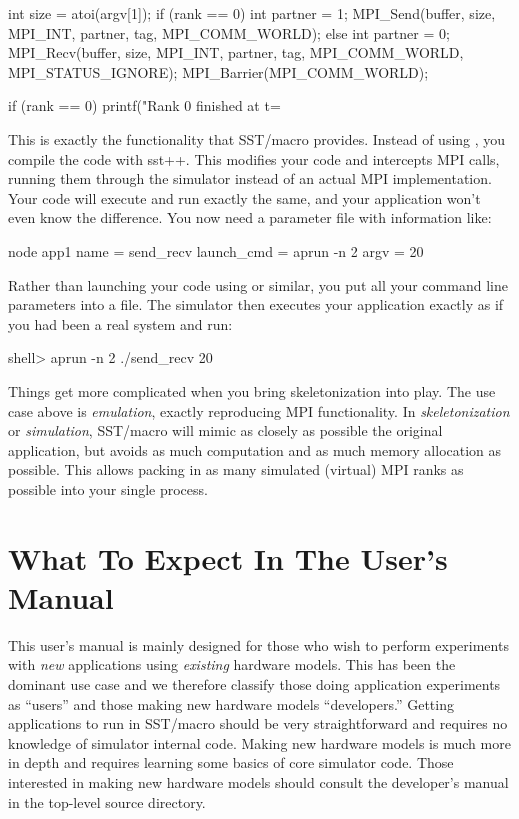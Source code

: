 \begin{CppCode}
int size = atoi(argv[1]);
if (rank == 0){
 int partner = 1;
  MPI_Send(buffer, size, MPI_INT, partner, tag, MPI_COMM_WORLD);
} else {
  int partner = 0;
  MPI_Recv(buffer, size, MPI_INT, partner, tag, MPI_COMM_WORLD, MPI_STATUS_IGNORE);
}
MPI_Barrier(MPI_COMM_WORLD);

if (rank == 0){
  printf("Rank 0 finished at t=%
}
\end{CppCode}

This is exactly the functionality that SST/macro provides.
Instead of using , you compile the code with {sst++}.
This modifies your code and intercepts MPI calls, running them through the simulator instead of an actual MPI implementation.
Your code will execute and run exactly the same, and your application won't even know the difference.
You now need a parameter file with information like:

\begin{ViFile}
node {
 app1 {
  name = send_recv
  launch_cmd = aprun -n 2
  argv = 20
 }
}
\end{ViFile}
Rather than launching your code using  or similar, you put all your command line parameters into a  file.
The simulator then executes your application exactly as if you had been a real system and run:

\begin{ShellCmd}
shell> aprun -n 2 ./send_recv 20
\end{ShellCmd}
Things get more complicated when you bring skeletonization into play.
The use case above is \emph{emulation}, exactly reproducing MPI functionality.
In \emph{skeletonization} or \emph{simulation}, SST/macro will mimic as closely as possible the original application,
but avoids as much computation and as much memory allocation as possible.
This allows packing in as many simulated (virtual) MPI ranks as possible into your single  process.

\section{What To Expect In The User's Manual}
This user's manual is mainly designed for those who wish to perform experiments with \emph{new} applications using \emph{existing} hardware models.
This has been the dominant use case and we therefore classify those doing application experiments as ``users'' and those making new hardware models ``developers.''
Getting applications to run in SST/macro should be very straightforward and requires no knowledge of simulator internal code.
Making new hardware models is much more in depth and requires learning some basics of core simulator code.
Those interested in making new hardware models should consult the developer's manual in the top-level source directory.
